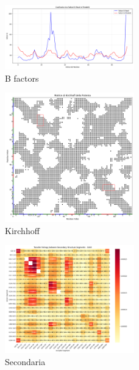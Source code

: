 \documentclass[Lau,binding=0.6cm,oneside,noexaminfo]{sapthesis}
\begin{document}
\begin{figure}[H]
    \centering
    \includegraphics[width=0.5\textwidth]{"images/3LNXConfronto tra Fattori B Reali e Predetti.png"}
    \caption{B factors}
\end{figure}
\begin{figure}[H]
    \centering
    \includegraphics[width=0.5\textwidth]{"images/3LNX_Matrice di Kirchhoff della Proteina.png"}
    \caption{Kirchhoff}
\end{figure}
\begin{figure}[H]
    \centering
    \includegraphics[width=0.5\textwidth]{"images/3LNXanalyze_secondary_structure_transfer_entropy.png"}
    \caption{Secondaria}
\end{figure}
\end{document}
